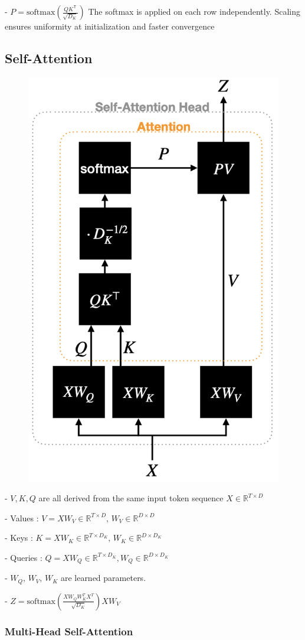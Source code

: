 - $P=\mathrm{softmax}\left({\frac{Q K^{\mathsf{T}}}{\sqrt{D_{K}}}}\right)$ The softmax is applied on each row independently. Scaling ensures uniformity
at initialization and faster convergence

\subsection*{Self-Attention}

\begin{figure}
  \includegraphics[width=0.4\columnwidth]{figures/self_attention.png}
\end{figure}

- $V,K,Q$ are all derived from the same input token
sequence $X\in\mathbb{R}^{T\times D}$

- Values : $V=X W_{V}\in\mathbb{R}^{T\times D},\,W_{V}\in\mathbb{R}^{D\times D}$

- Keys : $K=X W_{K}\in\mathbb{R}^{T\times D_{K}},\,W_{K}\in\mathbb{R}^{D\times D_{K}}$

- Queries : $Q=X W_{Q}\in\mathbb{R}^{T\times D_{K}},W_{Q}\in\mathbb{R}^{D\times D_{K}}$

- $W_{Q},\,W_{V},\,W_{K}$ are learned parameters.

- $Z=\mathrm{softmax}\left(\frac{X W_{Q}W_{K}^{T}X^{T}}{\sqrt{D_{K}}}\right)X W_{V}$

\subsubsection*{Multi-Head Self-Attention}


